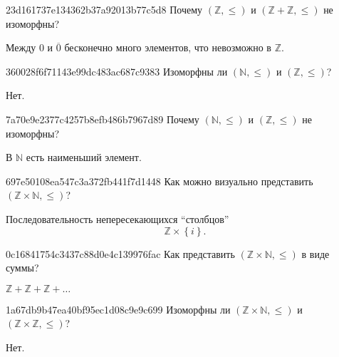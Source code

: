 \begin{note}{23d161737e134362b37a92013b77c5d8}
    Почему \({ (\mathbb Z, \leqslant) }\) и \({ (\mathbb Z + \mathbb Z, \leqslant) }\) не изоморфны?

    \begin{cloze}{1}
        Между \({ 0 }\) и \({ \overline{0} }\) бесконечно много элементов, что невозможно в \({ \mathbb Z }\).
    \end{cloze}
\end{note}

\begin{note}{360028f6f71143e99dc483ac687c9383}
    Изоморфны ли \({ (\mathbb N, \leqslant) }\) и \({ (\mathbb Z, \leqslant) }\)?

    \begin{cloze}{1}
        Нет.
    \end{cloze}
\end{note}

\begin{note}{7a70e9e2377c4257b8efb486b7967d89}
    Почему \({ (\mathbb N, \leqslant) }\) и \({ (\mathbb Z, \leqslant) }\) не изоморфны?

    \begin{cloze}{1}
        В \({ \mathbb N }\) есть наименьший элемент.
    \end{cloze}
\end{note}

\begin{note}{697e50108ea547c3a372fb441f7d1448}
    Как можно визуально представить \({ (\mathbb Z \times \mathbb N, \leqslant) }\)?

    \begin{cloze}{1}
        Последовательность непересекающихся ``столбцов''
        \[
            \mathbb Z \times \left\{ i \right\}.
        \]
    \end{cloze}
\end{note}

\begin{note}{0c16841754c3437c88d0e4c139976fac}
    Как представить \({ (\mathbb Z \times \mathbb N, \leqslant) }\) в виде суммы?

    \begin{cloze}{1}
        \({ \mathbb Z + \mathbb Z + \mathbb Z + \ldots }\)
    \end{cloze}
\end{note}

\begin{note}{1a67db9b47ea40bf95ec1d08c9e9c699}
    Изоморфны ли \({ (\mathbb Z \times \mathbb N, \leqslant) }\) и \({ (\mathbb Z \times \mathbb Z, \leqslant) }\)?

    \begin{cloze}{1}
        Нет.
    \end{cloze}
\end{note}

